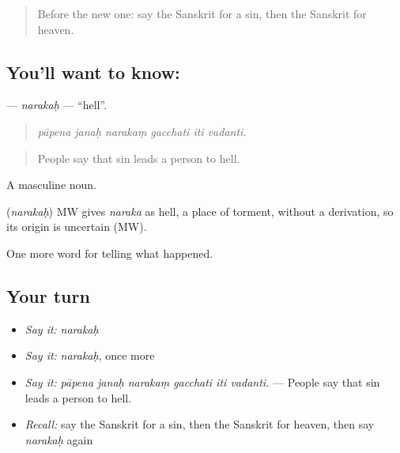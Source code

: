 \label{lesson:SA-C338-narakah}



\begin{quote}
Before the new one: say the Sanskrit for a sin, then the Sanskrit for heaven.
\end{quote}

\subsection*{You'll want to know: }
\textbf{} — \emph{narakaḥ} — \textquotedblleft{}hell\textquotedblright{}.

\begin{quote}
     
\end{quote}

\begin{quote}
\emph{pāpena janaḥ narakaṃ gacchati iti vadanti.}
\end{quote}

\begin{quote}
People say that sin leads a person to hell.
\end{quote}

A masculine noun.

\begin{cousinweb}
\textbf{} (\emph{narakaḥ}) MW gives \emph{naraka} as hell, a place of torment, without a derivation, so its origin is uncertain (MW).
\end{cousinweb}

\begin{grammarlens}[title={What you've built}]
One more word for telling what happened.
\end{grammarlens}

\subsection*{Your turn}
\begin{itemize}
\raggedright
  \item \emph{Say it:} \emph{narakaḥ}
  \item \emph{Say it:} \emph{narakaḥ}, once more
  \item \emph{Say it:} \emph{pāpena janaḥ narakaṃ gacchati iti vadanti.} — People say that sin leads a person to hell.
  \item \emph{Recall:} say the Sanskrit for a sin, then the Sanskrit for heaven, then say \emph{narakaḥ} again
\end{itemize}

